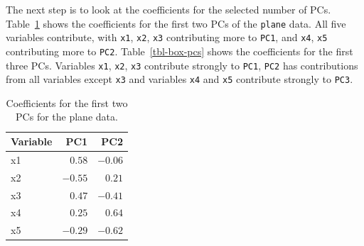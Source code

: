 \documentclass[
  letterpaper,
]{krantz}
\newenvironment{Shaded}{\begin{snugshade}}{\end{snugshade}}
\newcommand{\AttributeTok}[1]{\textcolor[rgb]{0.40,0.45,0.13}{#1}}
\newcommand{\DecValTok}[1]{\textcolor[rgb]{0.68,0.00,0.00}{#1}}
\newcommand{\FunctionTok}[1]{\textcolor[rgb]{0.28,0.35,0.67}{#1}}
\newcommand{\NormalTok}[1]{\textcolor[rgb]{0.00,0.23,0.31}{#1}}
\newcommand{\SpecialCharTok}[1]{\textcolor[rgb]{0.37,0.37,0.37}{#1}}
\newcommand{\StringTok}[1]{\textcolor[rgb]{0.13,0.47,0.30}{#1}}
\begin{document}
The next step is to look at the coefficients for the selected number of
PCs. Table~\ref{tbl-plane-pcs} shows the coefficients for the first two
PCs of the \texttt{plane} data. All five variables contribute, with
\texttt{x1}, \texttt{x2}, \texttt{x3} contributing more to \texttt{PC1},
and \texttt{x4}, \texttt{x5} contributing more to \texttt{PC2}.
Table~\ref{tbl-box-pcs} shows the coefficients for the first three PCs.
Variables \texttt{x1}, \texttt{x2}, \texttt{x3} contribute strongly to
\texttt{PC1}, \texttt{PC2} has contributions from all variables except
\texttt{x3} and variables \texttt{x4} and \texttt{x5} contribute
strongly to \texttt{PC3}.

\begin{Shaded}
\end{Shaded}

\hypertarget{tbl-plane-pcs}{}
\begin{longtable}{lrr}
\caption{\label{tbl-plane-pcs}Coefficients for the first two PCs for the plane data. }\tabularnewline

\toprule
Variable & PC1 & PC2 \\ 
\midrule
x1 & $0.58$ & $-0.06$ \\ 
x2 & $-0.55$ & $0.21$ \\ 
x3 & $0.47$ & $-0.41$ \\ 
x4 & $0.25$ & $0.64$ \\ 
x5 & $-0.29$ & $-0.62$ \\ 
\bottomrule
\end{longtable}

\begin{Shaded}
\end{Shaded}
\end{document}
